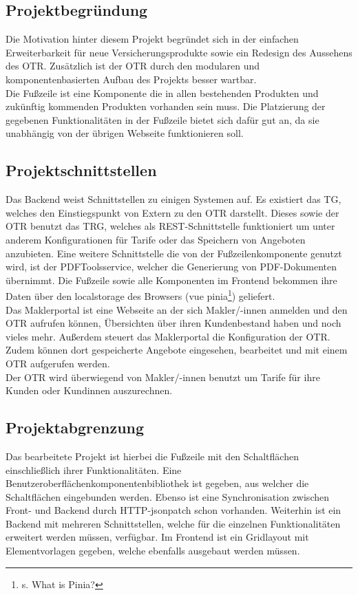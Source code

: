 \subsection{Projektbegründung}
\label{projektbegründung}
Die Motivation hinter diesem Projekt begründet sich in der einfachen Erweiterbarkeit für neue Versicherungsprodukte sowie ein Redesign des Aussehens des \ac{OTR}. Zusätzlich ist der \ac{OTR} durch den modularen und komponentenbasierten Aufbau des Projekts besser wartbar. \\
Die Fußzeile ist eine Komponente die in allen bestehenden Produkten und zukünftig kommenden Produkten vorhanden sein muss. Die Platzierung der gegebenen Funktionalitäten in der Fußzeile bietet sich dafür gut an, da sie unabhängig von der übrigen Webseite funktionieren soll.
\subsection{Projektschnittstellen}
\label{projektschnittstellen}
Das Backend weist Schnittstellen zu einigen Systemen auf. Es existiert das \ac{TG}, welches den Einstiegspunkt von Extern zu den \ac{OTR} darstellt. Dieses sowie der \ac{OTR} benutzt das \ac{TRG}, welches als \gls{REST}-Schnittstelle funktioniert um unter anderem Konfigurationen für Tarife oder das Speichern von Angeboten anzubieten.
Eine weitere Schnittstelle die von der Fußzeilenkomponente genutzt wird, ist der PDFToolsservice, welcher die Generierung von PDF-Dokumenten übernimmt. Die Fußzeile sowie alle Komponenten im Frontend bekommen ihre Daten über den \gls{localstorage} des Browsers (\gls{vue} \gls{pinia}\footnote{s.\cite{Pinia2022} What is Pinia?}) geliefert.\\
Das Maklerportal ist eine Webseite an der sich Makler/-innen anmelden und den \ac{OTR} aufrufen können, Übersichten über ihren Kundenbestand haben und noch vieles mehr. Außerdem steuert das Maklerportal die Konfiguration der \ac{OTR}. Zudem können dort gespeicherte Angebote eingesehen, bearbeitet und mit einem \ac{OTR} aufgerufen werden.\\
Der \ac{OTR} wird überwiegend von Makler/-innen benutzt um Tarife für ihre Kunden oder Kundinnen auszurechnen.


\subsection{Projektabgrenzung}
\label{projektabgrenzung}
Das bearbeitete Projekt ist hierbei die Fußzeile mit den Schaltflächen einschließlich ihrer Funktionalitäten. Eine Benutzeroberflächenkomponentenbibliothek ist gegeben, aus welcher die Schaltflächen eingebunden werden. Ebenso ist eine Synchronisation zwischen Front- und Backend durch \gls{HTTP}-\gls{jsonpatch} schon vorhanden. Weiterhin ist ein Backend mit mehreren Schnittstellen, welche für die einzelnen Funktionalitäten erweitert werden müssen, verfügbar. Im Frontend ist ein Gridlayout mit Elementvorlagen gegeben, welche ebenfalls ausgebaut werden müssen.